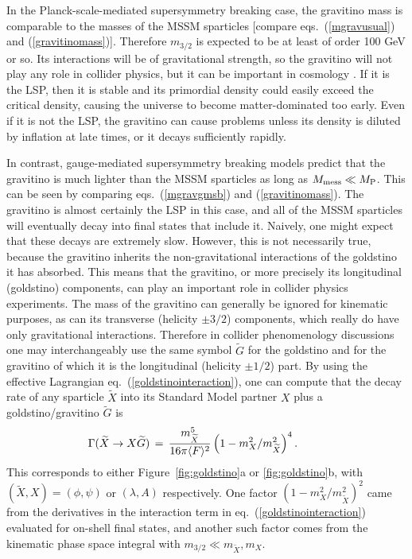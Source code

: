 \documentclass[12pt]{article}
\def\beq{\begin{eqnarray}}
\def\eeq{\end{eqnarray}}
\def\stilde{\widetilde}
\def\MPlanck{M_{\rm P}}
\begin{document}
In the Planck-scale-mediated supersymmetry breaking case, the gravitino 
mass is comparable to the masses of the MSSM sparticles [compare 
eqs.~(\ref{mgravusual}) and (\ref{gravitinomass})]. Therefore $m_{3/2}$ is 
expected to be at least of order 100 GeV or so. Its interactions will be 
of gravitational strength, so the gravitino will not play any role in 
collider physics, but it can be important in cosmology 
\cite{cosmogravitino}. If it is the LSP, then it is stable and its 
primordial density could easily exceed the critical density, causing the 
universe to become matter-dominated too early. Even if it is not the LSP, 
the gravitino can cause problems unless its density is diluted by 
inflation at late times, or it decays sufficiently rapidly.

In contrast, gauge-mediated supersymmetry breaking models predict that the 
gravitino is much lighter than the MSSM sparticles as long as $M_{\rm 
mess} \ll \MPlanck$. This can be seen by comparing eqs.~(\ref{mgravgmsb}) 
and (\ref{gravitinomass}). The gravitino is almost certainly the LSP in 
this case, and all of the MSSM sparticles will eventually decay into final 
states that include it. Naively, one might expect that these decays are 
extremely slow. However, this is not necessarily true, because the 
gravitino inherits the non-gravitational interactions of the goldstino it 
has absorbed. This means that the gravitino, or more precisely its 
longitudinal (goldstino) components, can play an important role in 
collider physics experiments. The mass of the gravitino can generally be 
ignored for kinematic purposes, as can its transverse (helicity $\pm 3/2$) 
components, which really do have only gravitational interactions. 
Therefore in collider phenomenology discussions one may interchangeably 
use the same symbol $\stilde G$ for the goldstino and for the gravitino of 
which it is the longitudinal (helicity $\pm 1/2$) part. By using the 
effective Lagrangian eq.~(\ref{goldstinointeraction}), one can compute 
that the decay rate of any sparticle $\stilde X$ into its Standard Model 
partner $X$ plus a goldstino/gravitino $\stilde G$ is 
\beq
\Gamma(\stilde X \rightarrow X\stilde G) \,=\,
{m^5_{\stilde X} \over 16 \pi \langle F \rangle^2}
\left ( 1 - {m_X^2/ m_{\stilde X}^2} \right )^4 .
\qquad\>\>{}
\label{generalgravdecay}
\eeq
This corresponds to either Figure~\ref{fig:goldstino}a or 
\ref{fig:goldstino}b, with $(\stilde X,X) = (\phi,\psi)$ or $(\lambda,A)$ 
respectively. One factor $(1 - m_X^2/m_{\stilde X}^2 )^2$ came from the 
derivatives in the interaction term in eq.~(\ref{goldstinointeraction}) 
evaluated for on-shell final states, and another such factor comes from 
the kinematic phase space integral with $m_{3/2} \ll m_{\stilde X}, m_X$.
\end{document}
